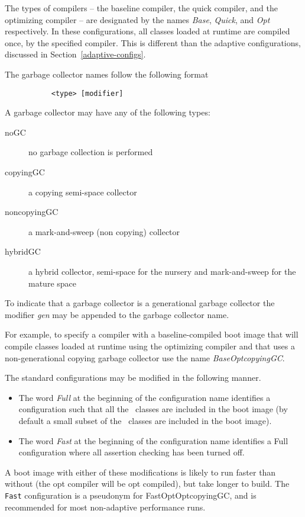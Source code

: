 The types of compilers -- the baseline compiler, the quick compiler, and 
the optimizing compiler -- are designated by the names {\em Base},
{\em Quick},  and {\em Opt} respectively.  In these configurations,
all classes loaded at runtime are compiled once, by the specified
compiler.  This is different than the adaptive configurations,
discussed in Section~\ref{adaptive-configs}.

The garbage collector names follow the following format
\begin{verbatim}
           <type> [modifier]
\end{verbatim}

A garbage collector may have any of the following types:

\begin{description}
\item[noGC] no garbage collection is performed
\item[copyingGC] a copying semi-space collector
\item[noncopyingGC] a mark-and-sweep (non copying) collector
\item[hybridGC] a hybrid collector, semi-space for the nursery and
mark-and-sweep for the mature space
\end{description}

To indicate that a garbage collector is a generational garbage collector 
the modifier {\em gen} may be appended to the garbage collector name.

For example, to specify a compiler with a baseline-compiled boot image
that will 
compile classes loaded at runtime using the optimizing compiler and that uses
a non-generational copying garbage collector use the name 
{\em BaseOptcopyingGC}.

The standard configurations may be modified in the following manner. 
\begin{itemize}
\item The word 
{\em Full} at the beginning of the configuration name identifies a 
configuration
such that all the \jp\ classes are included in the boot image (by default
a small subset of the \jp\ classes are included in the boot image). 
\item The word
{\em Fast} at the beginning of the configuration name identifies a Full
configuration where all assertion checking has been turned off. 
\end{itemize}
A boot image with
either of these modifications is likely to run faster than without
(the opt compiler will be opt compiled),
but take longer to build.  The {\tt
Fast} configuration is a pseudonym for FastOptOptcopyingGC, and is
recommended for most non-adaptive performance runs.

